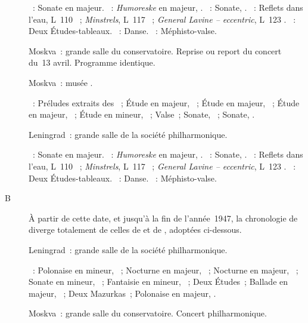 \begin{description}
 \textsc{\Mozart{}}~: Sonate en \kB \Flat majeur.
 \textsc{\Schumann{}}~: \emph{Humoreske} en \kB \Flat majeur, .
 \textsc{\Scriabine{}}~: Sonate, .
 \textsc{\Debussy{}}~: Reflets dans l'eau, L~110 ~;
 \emph{Minstrels}, L~117 ~; \emph{General Lavine -- eccentric},
 L~123 .
 \textsc{\Rachmaninov{}}~: Deux Études-tableaux.
 \textsc{\Prokofiev{}}~: Danse.
 \textsc{\Liszt{}}~: Méphisto-valse.
 \item[\DateWithWeekDay{1947-04-18}]
 Moskva~: grande salle du conservatoire.
 Reprise ou report du concert du~13 avril.
 Programme identique.
 \item[\DateWithWeekDay{1947-04-20}]
 Moskva~: musée \Scriabine{}.

 \textsc{\Scriabine{}}~: Préludes extraits des ~;
 Étude en \kB majeur,  ~; Étude en \kE majeur, 
 ~; Étude en \kA \Flat majeur,  ~; Étude en \kG
 \Sharp mineur,  ~; Valse~; Sonate, ~; Sonate,
 .
 \item[\DateWithWeekDay{1947-04-24}]
 Leningrad~: grande salle de la société philharmonique.

 \textsc{\Mozart{}}~: Sonate en \kB \Flat majeur.
 \textsc{\Schumann{}}~: \emph{Humoreske} en \kB \Flat majeur, .
 \textsc{\Scriabine{}}~: Sonate, .
 \textsc{\Debussy{}}~: Reflets dans l'eau, L~110 ~;
 \emph{Minstrels}, L~117 ~; \emph{General Lavine -- eccentric},
 L~123 .
 \textsc{\Rachmaninov{}}~: Deux Études-tableaux.
 \textsc{\Prokofiev{}}~: Danse.
 \textsc{\Liszt{}}~: Méphisto-valse.
 \item[B\DateWithWeekDay{1947-04-26}]
 À partir de cette date, et jusqu'à la fin de l'année~1947, la chronologie
 de \citet[p.~168]{Nekrasova08} diverge totalement de celles de
 \citet[p.~460]{Milshteyn82a} et de \citet[p.~426-428]{Scriabine}, adoptées
 ci-dessous.
 \item[\DateWithWeekDay{1947-04-28}]
 Leningrad~: grande salle de la société philharmonique.

 \textsc{\Chopin{}}~: Polonaise en \kC \Sharp mineur,  ~;
 Nocturne en \kF \Sharp majeur,  ~; Nocturne en \kF
 majeur,  ~; Sonate en \kB \Flat mineur, ~;
 Fantaisie en \kF mineur, ~; Deux Études~; Ballade en \kA \Flat
 majeur, ~; Deux Mazurkas~; Polonaise en \kA \Flat majeur,
 .
 \item[\DateWithWeekDay{1947-05-15}]
 Moskva~: grande salle du conservatoire.
 Concert philharmonique.


\end{description}
